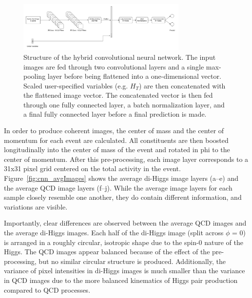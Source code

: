 \begin{figure}[!h] 
\begin{center}
\includegraphics*[width=0.75\textwidth] {CNN/figures/hybridCNN.png}
\caption{Structure of the hybrid convolutional neural network. The input images are fed through two convolutional layers and a single max-pooling layer before being flattened into a one-dimensional vector. Scaled user-specified variables (e.g. $H_{T}$) are then concatenated with the flattened image vector. The concatenated vector is then fed through one fully connected layer, a batch normalization layer, and a final fully connected layer before a final prediction is made.}
  \label{fig:cnn_hybrid}
\end{center}
\end{figure}

In order to produce coherent images, the center of mass and the center of momentum for each event are calculated. All constituents are then boosted longitudinally into the center of mass of the event and rotated in phi to the center of momentum. After this pre-processing, each image layer corresponds to a 31x31 pixel grid centered on the total activity in the event. Figure~\ref{fig:cnn_avgImages} shows the average di-Higgs image layers (a--e) and the average QCD image layers (f--j). While the average image layers for each sample closely resemble one another, they do contain different information, and variations are visible.

Importantly, clear differences are observed between the average QCD images and the average di-Higgs images. Each half of the di-Higgs image (split across $\phi$ = 0) is arranged in a roughly circular, isotropic shape due to the spin-0 nature of the Higgs. The QCD images appear balanced because of the effect of the pre-processing, but no similar circular structure is produced. Additionally, the variance of pixel intensities in di-Higgs images is much smaller than the variance in QCD images due to the more balanced kinematics of Higgs pair production compared to QCD processes.

